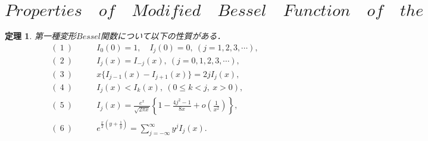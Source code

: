 \documentclass[a4j,papersize,disablejfam,slide,14pt]{jsarticle}
\newtheorem{Prop}{定理}
\def\exp#1{e^{#1}} %
\begin{document}
\section{$Properties\quad of\quad Modified\quad Bessel\quad Function\quad of\quad the\quad First\quad Kind$}
\label{sec:appendix_bessel_property}
	\begin{screen}
		\begin{Prop}
    		第一種変形$Bessel$関数について以下の性質がある．
        	\begin{align}
        		(\ 1\ ) &\qquad I_0(0) = 1,\quad I_j(0) = 0,\ (j = 1,2,3,\cdots), \\
            	(\ 2\ ) &\qquad I_j(x) = I_{-j}(x),\ (j = 0,1,2,3,\cdots), \\
            	(\ 3\ ) &\qquad x\{I_{j-1}(x) - I_{j+1}(x)\} = 2jI_j(x), \\
            	(\ 4\ ) &\qquad I_j(x) < I_k(x),\ (0 \leq k < j,\ x > 0), \\
            	(\ 5\ ) &\qquad I_j(x) = \frac{\exp{x}}{\sqrt{2 \pi x}} \left\{ 1-\frac{4j^2 - 1}{8x} + o\left( \frac{1}{x^2} \right) \right\}, \\
                (\ 6\ ) &\qquad \exp{\frac{x}{2}\left(y + \frac{1}{y}\right)} = \sum_{j=-\infty}^{\infty} y^jI_j(x). 
        	\end{align}
    	\end{Prop}
    \end{screen}
\end{document}
